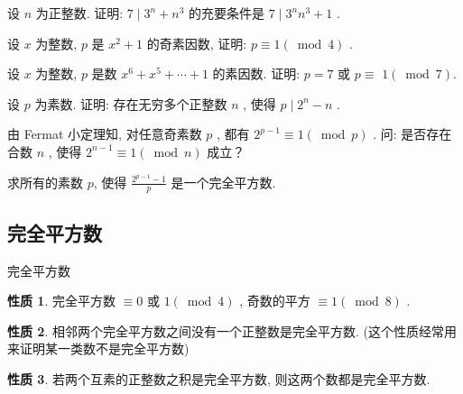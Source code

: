\documentclass[aspectratio=169]{ctexbeamer}
\theoremstyle{definition}
\newtheorem{property}{性质}[section]
\begin{document}
\setcounter{theorem}{0}

\begin{frame}[t]
	\begin{example}
		设 $n$ 为正整数. 证明: $7 \mid 3^{n}+n^{3}$ 的充要条件是 $7 \mid 3^{n} n^{3}+1$ .
	\end{example}
\end{frame}

\begin{frame}[t]
	\begin{example}
		设 $x$ 为整数,  $p$ 是 $x^{2}+1$ 的奇素因数, 证明:  $p \equiv 1(\bmod 4)$ .
	\end{example}
\end{frame}

\begin{frame}[t]
	\begin{example}
		设 $x$ 为整数,  $p$ 是数 $x^{6}+x^{5}+\cdots+1$ 的素因数. 证明:  $p=7$ 或 $p \equiv$ $1(\bmod 7)$.
	\end{example}
\end{frame}

\begin{frame}[t]
	\begin{example}
		设 $p$ 为素数. 证明: 存在无穷多个正整数 $n$ , 使得 $p \mid 2^{n}-n$ .
	\end{example}
\end{frame}

\begin{frame}[t]
	\begin{example}
		由 Fermat 小定理知, 对任意奇素数 $p$ , 都有 $2^{p-1} \equiv 1(\bmod p)$ . 问: 是否存在合数 $n$ , 使得 $2^{n-1} \equiv 1(\bmod n)$ 成立？
	\end{example}
\end{frame}

\begin{frame}[t]
	\begin{example}
		求所有的素数 $p$, 使得 $\frac{2^{p-1}-1}{p}$ 是一个完全平方数.
	\end{example}
\end{frame}

\subsection{完全平方数}\setcounter{theorem}{0}
\begin{frame}{完全平方数}
	\begin{property}\label{prop:完全平方数-1}
		完全平方数 $\equiv 0$ 或 $1(\bmod 4)$ , 奇数的平方 $\equiv 1(\bmod 8)$ .
	\end{property}
	\begin{property}
		相邻两个完全平方数之间没有一个正整数是完全平方数. (这个性质经常用来证明某一类数不是完全平方数)
	\end{property}
	\begin{property}
		若两个互素的正整数之积是完全平方数, 则这两个数都是完全平方数.
	\end{property}
\end{frame}
\end{document}
